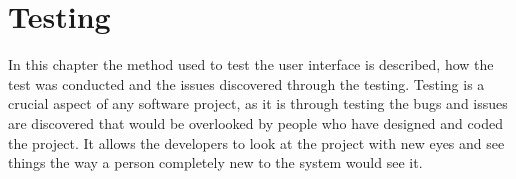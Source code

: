 \chapter{Testing}

In this chapter the method used to test the user interface is described, how the test was conducted and the issues discovered through the testing. Testing is a crucial aspect of any software project, as it is through testing the bugs and issues are discovered that would be overlooked by people who have designed and coded the project. It allows the developers to look at the project with new eyes and see things the way a person completely new to the system would see it.


